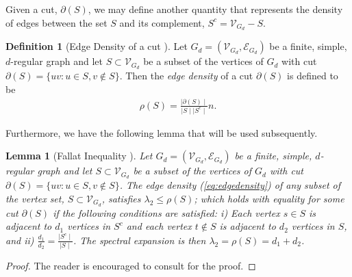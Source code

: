 \documentclass[reqno,8pt]{amsart}
\newtheorem{lemma}{Lemma}
\theoremstyle{definition}
\newtheorem{definition}{Definition}
\theoremstyle{remark}
\numberwithin{equation}{section}
\def\R{\mathbb{R}}
\def\cVGD{\mathcal{V}_{G_d}}
\def\cEGD{\mathcal{E}_{G_d}}
\def\GD{G_d=(\cVGD,\cEGD)}
\begin{document}
Given a cut, $\partial (S)$, we may define another quantity that represents the density of edges between the set $S$ and its complement, $S^c = \cVGD-S$. 
\begin{definition}[Edge Density of a cut \cite{Fallat2003}]\label{def:edgedensity} Let $\GD$ be a finite, simple, $d$-regular graph and let $S \subset \cVGD$ be a subset of the vertices of $G_d$ with cut $\partial(S)=\{uv: u\in S, v \not\in S\}$. Then the \textit{edge density} of a cut $\partial (S)$ is defined to be
\begin{align}\label{eq:edgedensity}
\rho (S) = \frac{\mid \partial(S) \mid}{\mid S \mid \mid S^c \mid}n.
\end{align}
\end{definition}
Furthermore, we have the following lemma that will be used subsequently.
\begin{lemma}[Fallat Inequality \cite{Fallat2003}]\label{lem:minedgedenalgconnect}
Let $\GD$ be a finite, simple, $d$-regular graph and let $S \subset \cVGD$ be a subset of the vertices of $G_d$ with cut $\partial(S)=\{uv: u\in S, v \not\in S\}$. The edge density (\ref{eq:edgedensity})
of any subset of the vertex set, $S \subset \cVGD$, satisfies $\lambda_2 \leq \rho(S)$;
which holds with equality for some cut $\partial (S)$ if the following conditions are satisfied: i) Each vertex $s \in S$ is adjacent to $d_1$ vertices in $S^c$ and each vertex $t \notin S$ is adjacent to $d_2$ vertices in $S$, and ii) $\frac{d_1}{d_2} = \frac{\mid S^c \mid}{\mid S \mid}$. The spectral expansion is then $\lambda_2 = \rho(S) = d_1+d_2$.
\end{lemma}
\begin{proof}
The reader is encouraged to consult \cite{Fallat2003} for the proof.
\end{proof}
\end{document}
